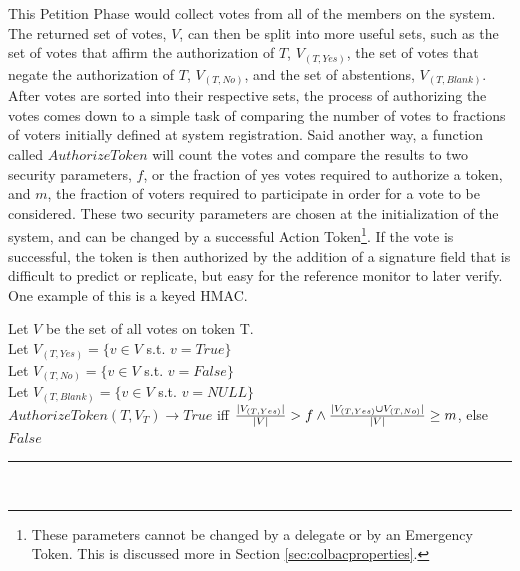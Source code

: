 \noindent This Petition Phase would collect votes from all of the members on the
system. The returned set of votes, $V$, can then be split into more useful
sets, such as the set of votes that affirm the authorization of $T$,
$V_{(T, Yes)}$, the set of votes that negate the authorization of $T$,
$V_{(T, No)}$, and the set of abstentions, $V_{(T, Blank)}$. After votes are
sorted into their respective sets, the process of authorizing the votes comes
down to a simple task of comparing the number of votes to fractions of voters
initially defined at system registration. Said another way, a function called
$AuthorizeToken$ will count the votes and compare the results to two security
parameters, $f$, or the fraction of yes votes required to authorize a token, and
$m$, the fraction of voters required to participate in order for a vote to be
considered. These two security parameters are chosen at the initialization of
the system, and can be changed by a successful Action Token\footnote{These
parameters cannot be changed by a delegate or by an Emergency Token. This is
discussed more in Section \ref{sec:colbacproperties}.}. If the vote is
successful, the token is then authorized by the addition of a signature field
that is difficult to predict or replicate, but easy for the reference monitor to
later verify. One example of this is a keyed HMAC.

\begin{definition}
Let $V$ be the set of all votes on token T.\\
Let $V_{(T, Yes)} = \{v \in V$ s.t. $v = True\}$\\
Let $V_{(T, No)} = \{v \in V$ s.t. $v = False\}$\\
Let $V_{(T, Blank)} = \{v \in V$ s.t. $v = NULL\}$\\
$AuthorizeToken(T,V_{T}) \rightarrow True$ iff $\frac{|V_{(T, Yes)}|}{|V|} > f
\wedge \\ \frac{|V_{(T,Yes)} \cup V_{(T, No)}|}{|V|} \ge m$, else $False$\\
\hrule\mbox{}\\
\end{definition}

